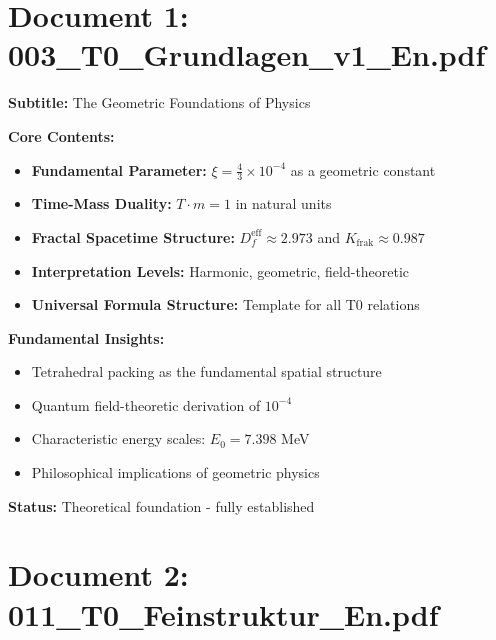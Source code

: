 	\section{Document 1: 003\_T0\_Grundlagen\_v1\_En.pdf}
	
	\begin{documentbox}
		\textbf{Subtitle:} The Geometric Foundations of Physics
		
		\textbf{Core Contents:}
		\begin{itemize}
			\item \textbf{Fundamental Parameter:} $\xi = \frac{4}{3} \times 10^{-4}$ as a geometric constant
			\item \textbf{Time-Mass Duality:} $T \cdot m = 1$ in natural units
			\item \textbf{Fractal Spacetime Structure:} $D_f^{\text{eff}} \approx 2.973$ and $K_{\text{frak}} \approx 0.987$
			\item \textbf{Interpretation Levels:} Harmonic, geometric, field-theoretic
			\item \textbf{Universal Formula Structure:} Template for all T0 relations
		\end{itemize}
		
		\textbf{Fundamental Insights:}
		\begin{itemize}
			\item Tetrahedral packing as the fundamental spatial structure
			\item Quantum field-theoretic derivation of $10^{-4}$
			\item Characteristic energy scales: $E_0 = 7.398$ MeV
			\item Philosophical implications of geometric physics
		\end{itemize}
		
		\textbf{Status:} Theoretical foundation - fully established
	\end{documentbox}
	
	\section{Document 2: 011\_T0\_Feinstruktur\_En.pdf}
	
